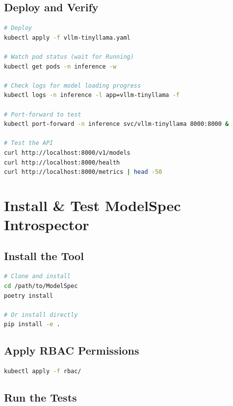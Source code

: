 \documentclass[11pt,a4paper]{article}
\begin{document}
\subsection{Deploy and Verify}

\begin{lstlisting}[language=bash]
# Deploy
kubectl apply -f vllm-tinyllama.yaml

# Watch pod status (wait for Running)
kubectl get pods -n inference -w

# Check logs for model loading progress
kubectl logs -n inference -l app=vllm-tinyllama -f

# Port-forward to test
kubectl port-forward -n inference svc/vllm-tinyllama 8000:8000 &

# Test the API
curl http://localhost:8000/v1/models
curl http://localhost:8000/health
curl http://localhost:8000/metrics | head -50
\end{lstlisting}

\section{Install \& Test ModelSpec Introspector}

\subsection{Install the Tool}

\begin{lstlisting}[language=bash]
# Clone and install
cd /path/to/ModelSpec
poetry install

# Or install directly
pip install -e .
\end{lstlisting}

\subsection{Apply RBAC Permissions}

\begin{lstlisting}[language=bash]
kubectl apply -f rbac/
\end{lstlisting}

\subsection{Run the Tests}
\end{document}

